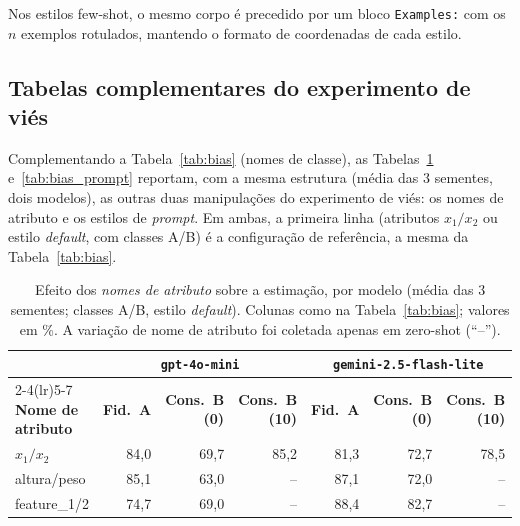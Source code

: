 \documentclass[12pt,a4paper]{article}
\begin{document}
Nos estilos few-shot, o mesmo corpo é precedido por um bloco \texttt{Examples:} com os $n$
exemplos rotulados, mantendo o formato de coordenadas de cada estilo.

\subsection{Tabelas complementares do experimento de viés}
\label{ap:bias_tabelas}

Complementando a Tabela~\ref{tab:bias} (nomes de classe), as
Tabelas~\ref{tab:bias_feat} e~\ref{tab:bias_prompt} reportam, com a mesma estrutura
(média das $3$ sementes, dois modelos), as outras duas manipulações do experimento de
viés: os nomes de atributo e os estilos de \emph{prompt}. Em ambas, a primeira linha
(atributos $x_1/x_2$ ou estilo \emph{default}, com classes A/B) é a configuração de
referência, a mesma da Tabela~\ref{tab:bias}.

\begin{table}[ht]
\centering
\caption{Efeito dos \emph{nomes de atributo} sobre a estimação, por modelo (média das $3$
sementes; classes A/B, estilo \emph{default}). Colunas como na Tabela~\ref{tab:bias};
valores em \%. A variação de nome de atributo foi coletada apenas em zero-shot (``--'').}
\label{tab:bias_feat}
\footnotesize
\setlength{\tabcolsep}{5pt}
\begin{tabular}{lrrrrrr}
\toprule
& \multicolumn{3}{c}{\textbf{\texttt{gpt-4o-mini}}} &
\multicolumn{3}{c}{\textbf{\texttt{gemini-2.5-flash-lite}}} \\
\cmidrule(lr){2-4}\cmidrule(lr){5-7}
\textbf{Nome de atributo} & \textbf{Fid.\ A} & \textbf{Cons.\ B (0)} &
\textbf{Cons.\ B (10)} &
\textbf{Fid.\ A} & \textbf{Cons.\ B (0)} & \textbf{Cons.\ B (10)} \\
\midrule
$x_1/x_2$    & 84,0 & 69,7 & 85,2 & 81,3 & 72,7 & 78,5 \\
altura/peso  & 85,1 & 63,0 & --   & 87,1 & 72,0 & --   \\
feature\_1/2 & 74,7 & 69,0 & --   & 88,4 & 82,7 & --   \\
\bottomrule
\end{tabular}
\end{table}
\end{document}
